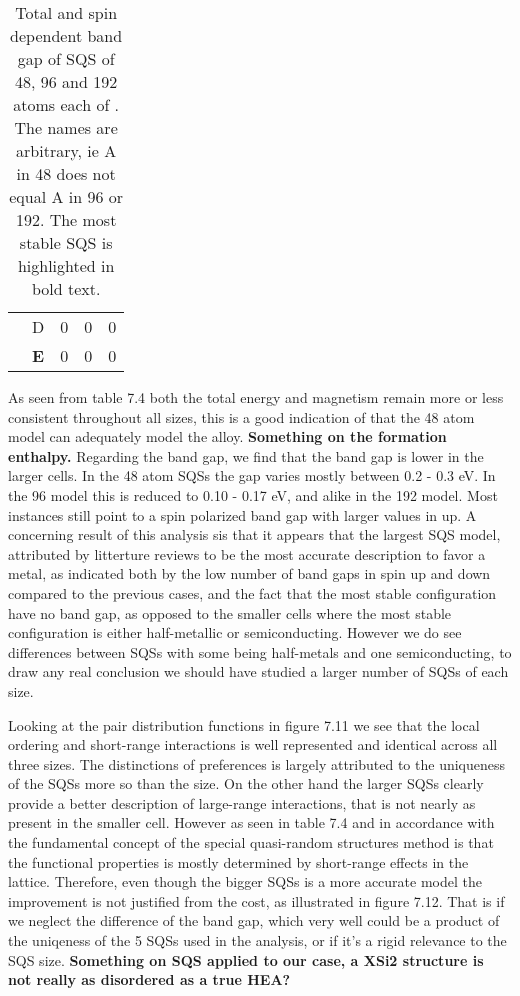\begin{table}[H]
\begin{tabular}{@{}ccccc@{}}
\multicolumn{1}{c|}{}                                & D & 0                     & 0                       & 0          \\
\multicolumn{1}{c|}{}                                & \textbf{E} & 0                & 0                       & 0                   \\ \bottomrule
\end{tabular}
\caption{Total and spin dependent band gap of SQS of 48, 96 and 192 atoms each of . The names are arbitrary, ie A in 48 does not equal A in 96 or 192. The most stable SQS is highlighted in bold text.}
\end{table}

As seen from table 7.4 both the total energy and magnetism remain more or less consistent throughout all sizes, this is a good indication of that the 48 atom model can adequately model the alloy. \textbf{Something on the formation enthalpy.} Regarding the band gap, we find that the band gap is lower in the larger cells. In the 48 atom SQSs the gap varies mostly between 0.2 - 0.3 eV. In the 96 model this is reduced to 0.10 - 0.17 eV, and alike in the 192 model. Most instances still point to a spin polarized band gap with larger values in up. A concerning result of this analysis sis that it appears that the largest SQS model, attributed by litterture reviews to be the most accurate description to favor a metal, as indicated both by the low number of band gaps in spin up and down compared to the previous cases, and the fact that the most stable configuration have no band gap, as opposed to the smaller cells where the most stable configuration is either half-metallic or semiconducting. However we do see differences between SQSs with some being half-metals and one semiconducting, to draw any real conclusion we should have studied a larger number of SQSs of each size. 

Looking at the pair distribution functions in figure 7.11 we see that the local ordering and short-range interactions is well represented and identical across all three sizes. The distinctions of preferences is largely attributed to the uniqueness of the SQSs more so than the size. On the other hand the larger SQSs clearly provide a better description of large-range interactions, that is not nearly as present in the smaller cell. However as seen in table 7.4 and in accordance with the fundamental concept of the special quasi-random structures method is that the functional properties is mostly determined by short-range effects in the lattice. Therefore, even though the bigger SQSs is a more accurate model the improvement is not justified from the cost, as illustrated in figure 7.12. That is if we neglect the difference of the band gap, which very well could be a product of the uniqeness of the 5 SQSs used in the analysis, or if it's a rigid relevance to the SQS size. \textbf{Something on SQS applied to our case, a XSi2 structure is not really as disordered as a true HEA?}      


